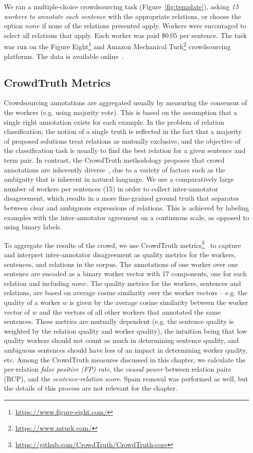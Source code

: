 We ran a multiple-choice crowdsourcing task (Figure~\ref{fig:template}), asking {\em 15 workers to annotate each sentence} with the appropriate relations, or choose the option $none$ if none of the relations presented apply. Workers were encouraged to select all relations that apply. Each worker was paid \$0.05 per sentence. The task was run on the Figure Eight\footnote{\url{https://www.figure-eight.com/}} and Amazon Mechanical Turk\footnote{\url{https://www.mturk.com/}} crowdsourcing platforms. The data is available online~\cite{crowdODrelexdata2016}.


\subsection{CrowdTruth Metrics}

Crowdsourcing annotations are aggregated usually by measuring the consensus of the workers (e.g. using majority vote). This is based on the assumption that a single right annotation exists for each example. In the problem of relation classification, the notion of a single truth is reflected in the fact that a majority of proposed solutions treat relations as mutually exclusive, and the objective of the classification task is usually to find the best relation for a given sentence and term pair. In contrast, the CrowdTruth methodology proposes that crowd annotations are inherently diverse~\cite{aroyo2015truth}, due to a variety of factors such as the ambiguity that is inherent in natural language. We use a comparatively large number of workers per sentences (15) in order to collect inter-annotator disagreement, which results in a more fine-grained ground truth that separates between clear and ambiguous expressions of relations. This is achieved by labeling examples with the inter-annotator agreement on a continuous scale, as opposed to using binary labels.

To aggregate the results of the crowd, we use CrowdTruth metrics\footnote{\url{https://github.com/CrowdTruth/CrowdTruth-core}}~\cite{dumitrache2018crowdtruth} to capture and interpret inter-annotator disagreement as quality metrics for the workers, sentences, and relations in the corpus. The annotations of one worker over one sentence are encoded as a binary worker vector with 17 components, one for each relation and including $none$. The quality metrics for the workers, sentences and relations, are based on average cosine similarity over the worker vectors --  e.g. the quality of a worker $w$ is given by the average cosine similarity between the worker vector of $w$ and the vectors of all other workers that annotated the same sentences. These metrics are mutually dependent (e.g. the sentence quality is weighted by the relation quality and worker quality), the intuition being that low quality workers should not count as much in determining sentence quality, and ambiguous sentences should have less of an impact in determining worker quality, etc. Among the CrowdTruth measures discussed in this chapter, we calculate the per-relation \textit{false positive (FP) rate}, the \textit{causal power} between relation pairs (RCP), and the \textit{sentence-relation score}. Spam removal was performed as well, but the details of this process are not relevant for the chapter.

